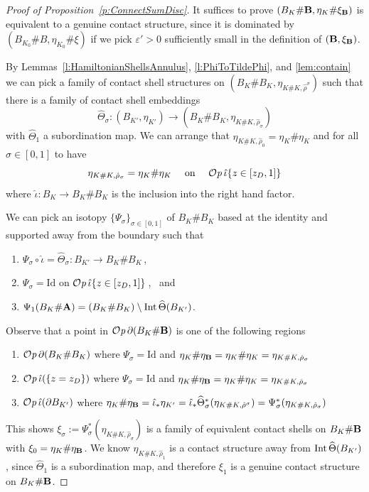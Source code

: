 \documentclass[12pt]{paper}
\theoremstyle{plain}
\theoremstyle{definition}
\newcommand{\wh}{\widehat}
\newcommand{\eps}{\varepsilon}
\newcommand{\A}{{\bf A}}
\newcommand{\B}{{\bf B}}
\newcommand{\Int}{{\rm Int\,}} %
\newcommand{\Id}{\mathrm {Id}}
\def\Op{{\mathcal O}{\it p}\,}
\numberwithin{figure}{section}
\begin{document}
\begin{proof}[Proof of Proposition~\ref{p:ConnectSumDisc}]
It suffices to prove $(B_K \# \B, \eta_K \# \xi_\B)$ is equivalent to a genuine contact structure,
since it is dominated by $(B_{K_0} \# B, \eta_{K_0} \# \xi)$ if we pick $\eps' > 0$ sufficiently small in the definition of $(\B, \xi_\B)$.

By Lemmas~\ref{l:HamiltonianShellsAnnulus}, \ref{l:PhiToTildePhi}, and \ref{lem:contain} we can pick
a family of contact shell structures on $(B_{K} \# B_{K}, \eta_{K\#K,\hat\rho^{\sigma}})$ 
such that there is   a family of contact shell embeddings
\begin{equation}\label{e:hatTheta}
	\wh\Theta_\sigma: (B_{K'}, \eta_{K'}) \to 
	(B_{K} \# B_{K}, \eta_{K\#K,\hat\rho_{\sigma}})
\end{equation}
with  $\wh\Theta_1$ a subordination map.  
We can arrange that $\eta_{K\#K, \hat\rho_0} = \eta_K \# \eta_K$ and 
for all $\sigma \in [0,1]$ to have
$$
\mbox{$\eta_{K\#K, \hat\rho_{\sigma}} = \eta_{K} \# \eta_{K}$ \quad on \quad 
$\Op \hat\iota\{z \in [z_D, 1]\}$}
$$
where 
$\hat\iota: B_{K} \to B_K \# B_K$ is the inclusion into the right hand factor. 


We can pick an isotopy $\{\Psi_{\sigma}\}_{\sigma \in [0,1]}$ of
$B_K \# B_K$ based at the identity and supported away from the boundary such that
\begin{enumerate}
\item $\Psi_\sigma \circ \hat\iota = \wh\Theta_\sigma: B_{K'} \to B_K \# B_K$\,,
\item $\Psi_\sigma = \Id$ on $\Op \hat\iota\{z \in [z_D, 1]\}$\,, \mbox{ and}
\item $\Psi_1(B_K \# \A) = (B_K \# B_K) \setminus \Int \wh\Theta(B_{K'})$.
\end{enumerate}
Observe that  a point 
in $\Op \partial(B_K \# \B)$ is one of the following regions
\begin{enumerate}
\item $\Op \partial(B_K \# B_K)$ where $\Psi_\sigma = \Id$ and $\eta_K \# \eta_\B = \eta_K \# \eta_K = \eta_{K\#K,\hat\rho_{\sigma}}$
\item $\Op \hat\iota(\{z = z_D\})$ where $\Psi_\sigma = \Id$ and $\eta_K \# \eta_\B = \eta_K \# \eta_K = \eta_{K\#K,\hat\rho_{\sigma}}$
\item $\Op \hat\iota(\partial B_{K'})$ where $\eta_{K}\#\eta_\B = \hat\iota_*\eta_{K'} 
= \hat\iota_* \wh\Theta_{\sigma}^*(\eta_{K\#K,\hat\rho^{\sigma}})
= \Psi_{\sigma}^*(\eta_{K\#K,\hat\rho_{\sigma}})$
\end{enumerate}
This shows $\xi_{\sigma} := \Psi_{\sigma}^*(\eta_{K\#K,\hat\rho_{\sigma}})$ is a family of equivalent contact shells on $B_K \# \B$
with $\xi_0 = \eta_K \# \eta_\B$.
We know $\eta_{K\#K,\hat\rho_1}$ is a contact structure away from
$\Int \wh\Theta(B_{K'})$, since $\wh\Theta_1$ is a subordination map, and therefore $\xi_1$ is a genuine contact
structure on $B_K \# \B$.
\end{proof}
\end{document}

